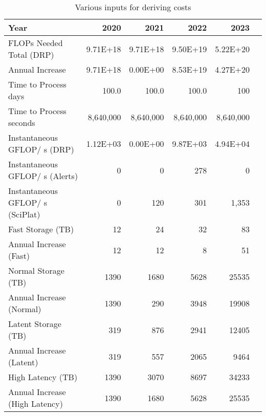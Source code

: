 \tiny \begin{longtable} { |p{}  |r  |r  |r  |r  |r |} 
\caption{Various inputs for deriving costs \label{tab:Inputs}}\\ 
\hline 
\textbf{Year}&\textbf{2020}&\textbf{2021}&\textbf{2022}&\textbf{2023} \\ \hline
{FLOPs Needed Total (DRP)}&{9.71E+18}&{9.71E+18}&{9.50E+19}&{5.22E+20} \\ \hline
{Annual Increase}&{9.71E+18}&{0.00E+00}&{8.53E+19}&{4.27E+20} \\ \hline
{Time to Process days}&{100.0}&{100.0}&{100.0}&{100} \\ \hline
{Time to Process seconds}&{8,640,000}&{8,640,000}&{8,640,000}&{8,640,000} \\ \hline
{Instantaneous GFLOP/ s (DRP)}&{1.12E+03}&{0.00E+00}&{9.87E+03}&{4.94E+04} \\ \hline
{Instantaneous GFLOP/ s (Alerts)}&{0}&{0}&{278}&{0} \\ \hline
{Instantaneous GFLOP/ s (SciPlat)}&{0}&{120}&{301}&{1,353} \\ \hline
{Fast Storage (TB)}&{12}&{24}&{32}&{83} \\ \hline
{Annual Increase (Fast)}&{12}&{12}&{8}&{51} \\ \hline
{Normal Storage (TB)}&{1390}&{1680}&{5628}&{25535} \\ \hline
{Annual Increase (Normal)}&{1390}&{290}&{3948}&{19908} \\ \hline
{Latent Storage  (TB)}&{319}&{876}&{2941}&{12405} \\ \hline
{Annual Increase (Latent)}&{319}&{557}&{2065}&{9464} \\ \hline
{High Latency (TB)}&{1390}&{3070}&{8697}&{34233} \\ \hline
{Annual Increase (High Latency)}&{1390}&{1680}&{5628}&{25535} \\ \hline
\end{longtable} \normalsize
